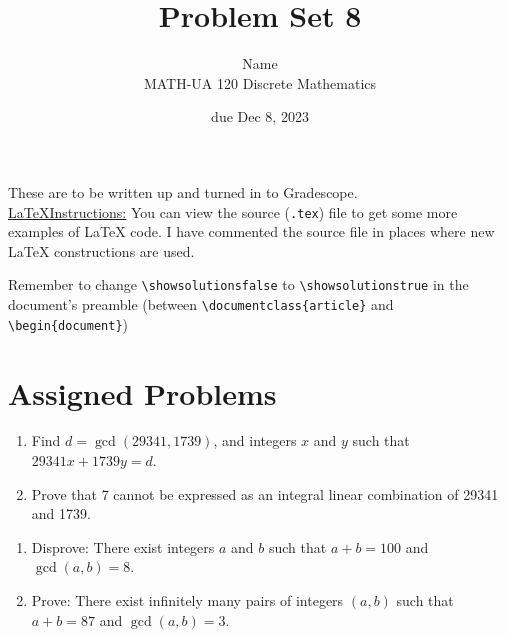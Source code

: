 \documentclass{article}
\title{Problem Set 8}
\author{%
    Name
\\  MATH-UA 120 Discrete Mathematics
}
\date{due Dec 8, 2023}
\newif\ifshowsolutions
\newcommand{\danger}{\marginpar[\hfill\dbend]{\dbend\hfill}}
\theoremstyle{definition}
\begin{document}
\maketitle



These are to be written up and turned in to Gradescope.\\



\ifshowsolutions
    \SetupExSheets{solution/print=true}
\else
    \danger
 \underline{ \LaTeX  Instructions:}  You can view the source (\texttt{.tex}) file to get some more examples of \LaTeX{} code.  I have commented the source file in places where new \LaTeX{} constructions are used.
  
  Remember to change \verb|\showsolutionsfalse| to \verb|\showsolutionstrue|
    in the document's preamble 
    (between \verb|\documentclass{article}| and \verb|\begin{document}|)
\fi

\section*{Assigned Problems}



\begin{question}
    \begin{enumerate}
        \item Find $d = \gcd(29341,1739)$, and integers $x$ and $y$ such that $29341x + 1739y = d$.
        \item Prove that 7 cannot be expressed as an integral linear combination of 29341 and 1739.
    \end{enumerate}
\end{question}
\begin{solution}
\end{solution}


\begin{question}
    \begin{enumerate}
        \item Disprove: There exist integers $a$ and $b$ such that $a+b=100$ and $\gcd(a, b)=8$.
        \item Prove: There exist infinitely many pairs of integers $(a,b)$ such that $a+b=87$ and $\gcd(a, b)=3$.
    \end{enumerate}
\end{question}
\begin{solution}
\end{solution}
\end{document}
